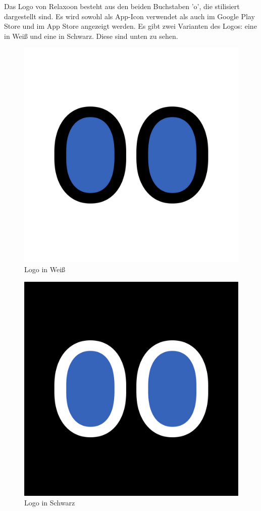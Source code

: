 Das Logo von Relaxoon besteht aus den beiden Buchstaben 'o', die stilisiert dargestellt sind. 
Es wird sowohl als App-Icon verwendet als auch im Google Play Store und im App Store angezeigt werden. Es gibt zwei 
Varianten des Logos: eine in Weiß und eine in Schwarz. Diese sind unten zu sehen.


\begin{figure}[H]
    \centering
    \includegraphics[height=0.5\textwidth]{./pics/Relaxoon Logo White.jpg}
    \caption{Logo in Weiß}
\end{figure}

\begin{figure}[H]
    \centering
    \includegraphics[height=0.5\textwidth]{./pics/Relaxoon Logo Black.jpg}
    \caption{Logo in Schwarz}
\end{figure}